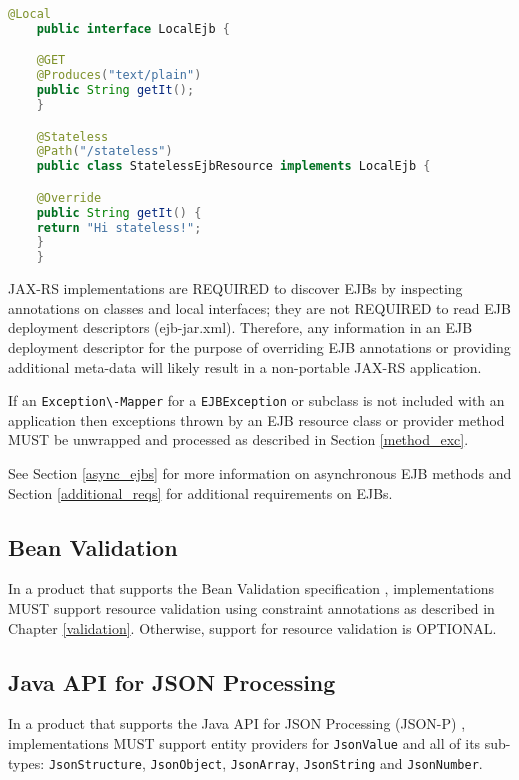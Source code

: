 \begin{lstlisting}[language=Java]
    @Local
    public interface LocalEjb {

    @GET
    @Produces("text/plain")
    public String getIt();
    }

    @Stateless
    @Path("/stateless")
    public class StatelessEjbResource implements LocalEjb {

    @Override
    public String getIt() {
    return "Hi stateless!";
    }
    }
\end{lstlisting}

JAX-RS implementations are REQUIRED to discover EJBs by inspecting annotations on classes and local interfaces; they are
not REQUIRED to read EJB deployment descriptors (ejb-jar.xml). Therefore, any information in an EJB deployment
descriptor for the purpose of overriding EJB annotations or providing additional meta-data will likely result in a
non-portable JAX-RS application.

If an \lstinline{Exception\-Mapper} for a \lstinline{EJBException} or subclass is not included with an application then
exceptions thrown by an EJB resource class or provider method MUST be unwrapped and processed as described in Section
\ref{method_exc}.

See Section \ref{async_ejbs} for more information on asynchronous EJB methods and Section \ref{additional_reqs} for
additional requirements on EJBs.

\subsection{Bean Validation}
\label{bv_support}

In a product that supports the Bean Validation specification \cite{bv11}, implementations MUST support resource
validation using constraint annotations as described in Chapter \ref{validation}. Otherwise, support for resource
validation is OPTIONAL.

\subsection{Java API for JSON Processing}
\label{jsonp}

In a product that supports the Java API for JSON Processing (JSON-P) \cite{jsonp}, implementations MUST support entity
providers for \lstinline{JsonValue} and all of its sub-types: \lstinline{JsonStructure}, \lstinline{JsonObject},
\lstinline{JsonArray}, \lstinline{JsonString} and \lstinline{JsonNumber}.

